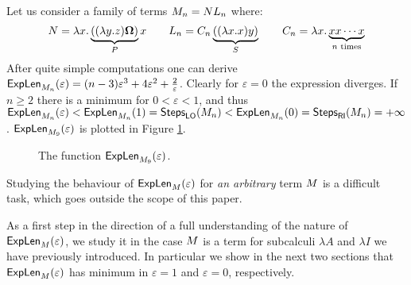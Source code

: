 \begin{example}
	Let us consider a family of terms $M_n=NL_n$ where:
	$$
	N = \lambda x.\underbrace{((\lambda y.z)\bm{\Omega})}_P x\qquad
	L_n = C_n\underbrace{((\lambda x.x)y)}_S\qquad
	C_n = \lambda  x.\underbrace{xx\cdots x}_{n\text{ times}}
	$$
	After quite simple computations one can derive $\textsf{ExpLen}_{M_n}(\varepsilon)=(n-3)\varepsilon^3+4\varepsilon^2+\frac{2}{\varepsilon}$. Clearly for $\varepsilon=0$ the expression diverges. If $n\geq 2$ there is a minimum for $0<\varepsilon<1$, and thus $\textsf{ExpLen}_{M_n}(\varepsilon)<\textsf{ExpLen}_{M_n}(1)=\textsf{Steps}_{\textsf{LO}}(M_n)<\textsf{ExpLen}_{M_n}(0)=\textsf{Steps}_{\textsf{RI}}(M_n)=+\infty$. $\textsf{ExpLen}_{M_9}(\varepsilon)$ is plotted in Figure \ref{figure:plot}.
	\begin{figure}[t]
		\caption{The function $\textsf{ExpLen}_{M_9}(\varepsilon)$.}
		\label{figure:plot}
	\end{figure}
\end{example}
Studying the behaviour of $\textsf{ExpLen}_{M}(\varepsilon)$ for \emph{an arbitrary} term $M$ is
a difficult task, which goes outside the scope of this paper.

As a first step in the direction of a full understanding of the nature
of $\textsf{ExpLen}_{M}(\varepsilon)$, we study it in the
case $M$ is a term for subcalculi $\lambda A$ and
$\lambda I$ we have previously introduced. In particular we show in the
next two sections that $\textsf{ExpLen}_{M}(\varepsilon)$ has minimum
in $\varepsilon=1$ and $\varepsilon=0$, respectively.
